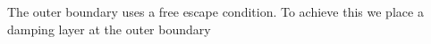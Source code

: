 The outer boundary uses a free escape condition. To achieve this we place a
damping layer at the outer boundary





